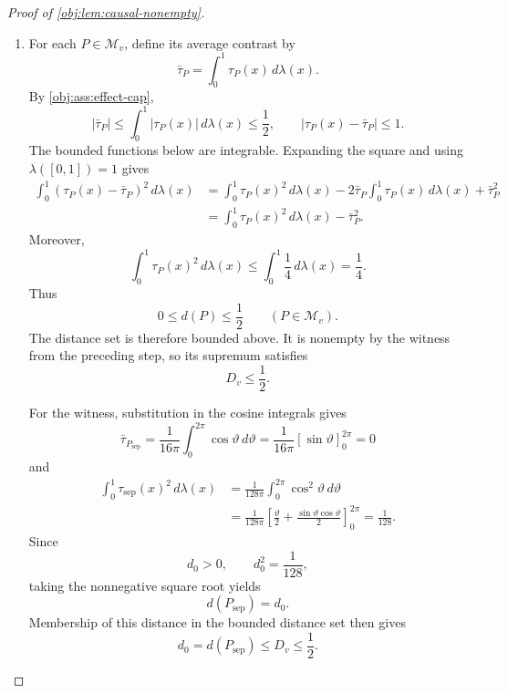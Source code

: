 \documentclass[11pt]{article}
\begin{document}
\begin{proof}[Proof of \cref{obj:lem:causal-nonempty}]
\begin{enumerate}
For the moment restriction, the baseline and effect caps imply
\[
|m_{0,\mathrm{sep}}(x)|\le1,
\qquad
|m_{0,\mathrm{sep}}(x)+\tau_{\mathrm{sep}}(x)|
\le |m_{0,\mathrm{sep}}(x)|+|\tau_{\mathrm{sep}}(x)|
\le1.
\]
Since \(p>0\), both deterministic arm kernels therefore satisfy
\[
\int |y|^p\,Q_{a_{\mathrm{arm}},P_{\mathrm{sep}}}(dy\mid x)
\le1\le10
\qquad
\bigl(a_{\mathrm{arm}}\in\{0,1\},\ x\in[0,1]\bigr).
\]
This verifies every restriction in \cref{obj:def:model}, and hence
\[
P_{\mathrm{sep}}\in\mathcal M_v.
\]

\item\label{proof:causal-nonempty:distance-bounds} For each \(P\in\mathcal M_v\), define its average contrast by
\[
\bar\tau_P=\int_0^1\tau_P(x)\,d\lambda(x).
\]
By \cref{obj:ass:effect-cap},
\[
|\bar\tau_P|
\le\int_0^1|\tau_P(x)|\,d\lambda(x)
\le\frac12,
\qquad
|\tau_P(x)-\bar\tau_P|\le1.
\]
The bounded functions below are integrable. Expanding the square and using
\(\lambda([0,1])=1\) gives
\[
\begin{aligned}
\int_0^1(\tau_P(x)-\bar\tau_P)^2\,d\lambda(x)
&=\int_0^1\tau_P(x)^2\,d\lambda(x)
 -2\bar\tau_P\int_0^1\tau_P(x)\,d\lambda(x)
 +\bar\tau_P^2\\
&=\int_0^1\tau_P(x)^2\,d\lambda(x)-\bar\tau_P^2.
\end{aligned}
\]
Moreover,
\[
\int_0^1\tau_P(x)^2\,d\lambda(x)
\le\int_0^1\frac14\,d\lambda(x)=\frac14.
\]
Thus
\[
0\le d(P)\le\frac12
\qquad(P\in\mathcal M_v).
\]
The distance set is therefore bounded above. It is nonempty by the witness from the preceding step, so its supremum satisfies
\[
D_v\le\frac12.
\]

For the witness, substitution in the cosine integrals gives
\[
\bar\tau_{P_{\mathrm{sep}}}
=\frac{1}{16\pi}\int_0^{2\pi}\cos\vartheta\,d\vartheta
=\frac{1}{16\pi}[\sin\vartheta]_0^{2\pi}
=0
\]
and
\[
\begin{aligned}
\int_0^1\tau_{\mathrm{sep}}(x)^2\,d\lambda(x)
&=\frac{1}{128\pi}
  \int_0^{2\pi}\cos^2\vartheta\,d\vartheta\\
&=\frac{1}{128\pi}
 \left[\frac{\vartheta}{2}
       +\frac{\sin\vartheta\cos\vartheta}{2}\right]_0^{2\pi}
=\frac1{128}.
\end{aligned}
\]
Since
\[
d_0>0,\qquad d_0^2=\frac1{128},
\]
taking the nonnegative square root yields
\[
d(P_{\mathrm{sep}})=d_0.
\]
Membership of this distance in the bounded distance set then gives
\[
d_0=d(P_{\mathrm{sep}})\le D_v\le\frac12.
\]


\end{enumerate}
\end{proof}
\end{document}
